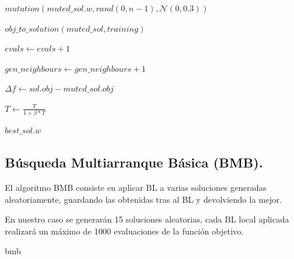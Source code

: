 \documentclass[11pt,a4paper]{article}
\theoremstyle{definition}
\begin{document}
\begin{algorithm}[H]
{{{					$mutation(muted\_sol.w, rand(0,n-1), \mathcal{N}(0,0.3))$
					
					$obj\_to\_solution(muted\_sol, training)$
					
					$evals \leftarrow evals+1$
					
					$gen\_neighbours \leftarrow gen\_neighbours +1 $
					
					$\Delta f \leftarrow sol.obj - muted\_sol.obj$
					
				}
				$T\leftarrow \frac{T}{1+\beta * T}$
			}
			
			\Return $best\_sol.w$
		}
	\end{algorithm}
	\subsection{Búsqueda Multiarranque Básica (BMB).}
	El algoritmo BMB consiste en aplicar BL a varias soluciones generadas aleatoriamente, guardando las obtenidas tras al BL y devolviendo la mejor.
	
	En nuestro caso se generarán 15 soluciones aleatorias, cada BL local aplicada realizará un máximo de 1000 evaluaciones de la función objetivo.\\
	
	\begin{algorithm}[H]
		\caption{bmb}
			
	\end{algorithm}
	
\end{document}
